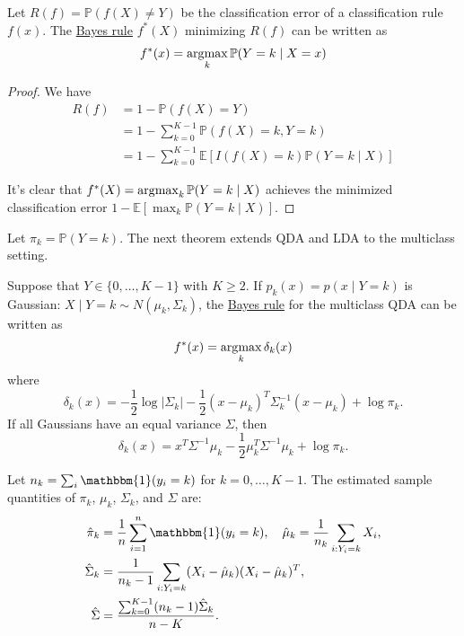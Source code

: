   \begin{theorem}
    \label{thm:optimality-of-the-bayes-classifier}
    Let $R(f) = \mathbb{P}(f(X) \neq Y)$ be the classification error of a classification rule $f(x)$. The \hyperref[prob-thm:bayes-rule]{Bayes rule} $f^{\ast}(X)$ minimizing $R(f)$ can be written as
    \begin{equation}
      f^{\ast}(x) = \operatorname*{\arg\!\max}_k \mathbb{P}(Y = k \mid X = x)
    \end{equation}
  \end{theorem}
  \begin{proof}
    We have
    \begin{align}
      R(f) &= 1 - \mathbb{P}(f(X) = Y) \\
      &= 1 - \sum_{k=0}^{K-1} \mathbb{P}(f(X) = k, Y = k) \\
      &= 1 - \sum_{k=0}^{K-1} \mathbb{E}\left[I(f(X) = k)\mathbb{P}(Y = k \mid X)\right]
    \end{align}
    
    It's clear that $f^{\ast}(X) = \operatorname*{\arg\!\max}_k \mathbb{P}(Y = k \mid X)$ achieves the minimized classification error $1 - \mathbb{E}[\max_k \mathbb{P}(Y = k \mid X)]$.
  \end{proof}

  Let $\pi_k = \mathbb{P}(Y = k)$. The next theorem extends QDA and LDA to the multiclass setting.

  \begin{theorem}
    \label{thm:multiclass-qda}
    Suppose that $Y \in \{0, \ldots, K - 1\}$ with $K \geq 2$. If $p_k(x) = p(x \mid Y = k)$ is Gaussian: $X \mid Y = k \sim N(\mu_k, \Sigma_k)$, the \hyperref[prob-thm:bayes-rule]{Bayes rule} for the multiclass QDA can be written as
    \begin{equation}
      f^{\ast}(x) = \operatorname*{\arg\!\max}_k \delta_k(x)
    \end{equation}
    where
    \begin{equation}
      \delta_k(x) = -\frac{1}{2}\log|\Sigma_k| - \frac{1}{2}(x - \mu_k)^T\Sigma_k^{-1}(x - \mu_k) + \log\pi_k.
    \end{equation}
    If all Gaussians have an equal variance $\Sigma$, then
    \begin{equation}
      \delta_k(x) = x^T\Sigma^{-1}\mu_k - \frac{1}{2}\mu_k^T\Sigma^{-1}\mu_k + \log\pi_k.
    \end{equation}
  \end{theorem}

  Let $n_k = \sum_i \mathbbm{1}(y_i = k)$ for $k = 0, \ldots, K - 1$. The estimated sample quantities of $\pi_k$, $\mu_k$, $\Sigma_k$, and $\Sigma$ are:
  \begin{align}
    \hat{\pi}_k &= \frac{1}{n}\sum_{i=1}^n \mathbbm{1}(y_i = k), \quad \hat{\mu}_k = \frac{1}{n_k}\sum_{i: Y_i = k} X_i, \\
    \hat{\Sigma}_k &= \frac{1}{n_k - 1}\sum_{i: Y_i = k} (X_i - \hat{\mu}_k)(X_i - \hat{\mu}_k)^T, \\
    \hat{\Sigma} &= \frac{\sum_{k=0}^{K-1}(n_k - 1)\hat{\Sigma}_k}{n - K}.
  \end{align}


